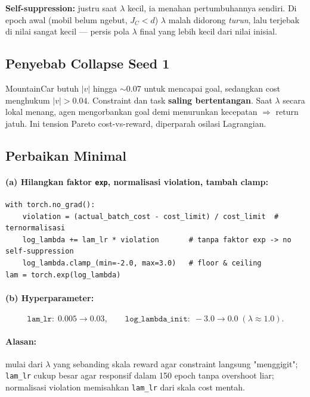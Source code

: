 \documentclass[11pt,a4paper]{article}
\begin{document}
\begin{catatan}
\textbf{Self-suppression:} justru saat $\lambda$ kecil, ia menahan pertumbuhannya
sendiri. Di epoch awal (mobil belum ngebut, $J_C < d$) $\lambda$ malah didorong
\emph{turun}, lalu terjebak di nilai sangat kecil --- persis pola $\lambda$ final
yang lebih kecil dari nilai inisial.
\end{catatan}

\subsection{Penyebab Collapse Seed 1}
MountainCar butuh $|v|$ hingga $\sim 0.07$ untuk mencapai goal, sedangkan cost
menghukum $|v| > 0.04$. Constraint dan task \textbf{saling bertentangan}. Saat
$\lambda$ secara lokal menang, agen mengorbankan goal demi menurunkan kecepatan
$\Rightarrow$ return jatuh. Ini tension Pareto cost-vs-reward, diperparah osilasi Lagrangian.

\subsection{Perbaikan Minimal}
\paragraph{(a) Hilangkan faktor \texttt{exp}, normalisasi violation, tambah clamp:}
\begin{lstlisting}
with torch.no_grad():
    violation = (actual_batch_cost - cost_limit) / cost_limit  # ternormalisasi
    log_lambda += lam_lr * violation       # tanpa faktor exp -> no self-suppression
    log_lambda.clamp_(min=-2.0, max=3.0)   # floor & ceiling
lam = torch.exp(log_lambda)
\end{lstlisting}

\paragraph{(b) Hyperparameter:}
\[ \texttt{lam\_lr}:\; 0.005 \rightarrow 0.03, \qquad \texttt{log\_lambda\_init}:\; -3.0 \rightarrow 0.0 \;(\lambda\approx 1.0). \]

\paragraph{Alasan:} mulai dari $\lambda$ yang sebanding skala reward agar constraint
langsung "menggigit"; \texttt{lam\_lr} cukup besar agar responsif dalam 150 epoch
tanpa overshoot liar; normalisasi violation memisahkan \texttt{lam\_lr} dari skala cost mentah.
\end{document}
